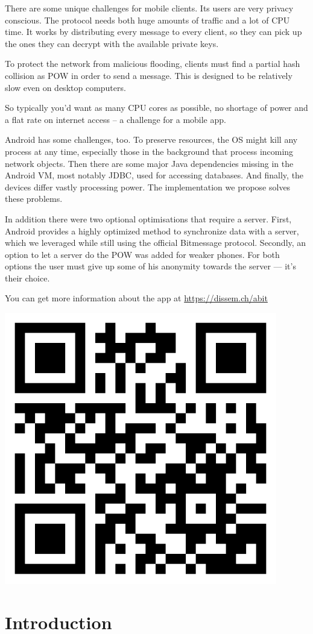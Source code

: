 \documentclass{bfh}
\begin{document}
  There are some unique challenges for mobile clients. Its users are very privacy conscious. The protocol needs both huge amounts of traffic and a lot of \acs{CPU} time. It works by distributing every message to every client, so they can pick up the ones they can decrypt with the available private keys.

  To protect the network from malicious flooding, clients must find a partial hash collision as \acl{POW} in order to send a message. This is designed to be relatively slow even on desktop computers.

  So typically you'd want as many \acs{CPU} cores as possible, no shortage of power and a flat rate on internet access – a challenge for a mobile app.

  Android\texttrademark{} has some challenges, too. To preserve resources, the \acl{OS} might kill any process at any time, especially those in the background that process incoming network objects. Then there are some major Java dependencies missing in the Android \acs{VM}, most notably \acs{JDBC}, used for accessing databases. And finally, the devices differ vastly processing power. The implementation we propose solves these problems.

  In addition there were two optional optimisations that require a server. First, Android provides a highly optimized method to synchronize data with a server, which we leveraged while still using the official Bitmessage protocol. Secondly, an option to let a server do the \acl{POW} was added for weaker phones. For both options the user must give up some of his anonymity towards the server --- it's their choice.

  You can get more information about the app at \url{https://dissem.ch/abit}

  \begin{center}
    \includegraphics[width=0.2 \textwidth]{images/QR_abit_webpage.pdf}
  \end{center}


  \newpage
  \tableofcontents


  \newpage
  \section{Introduction}
\end{document}
